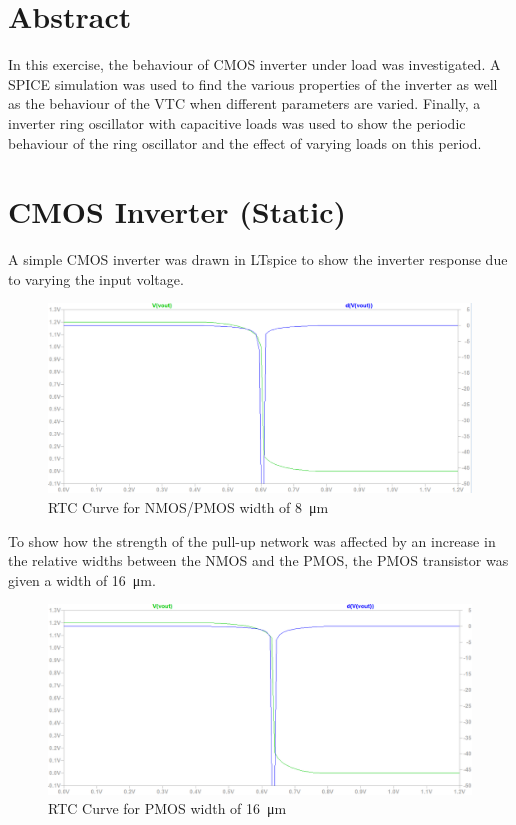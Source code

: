 \documentclass[CMPE]{../KGCOEReport}
\begin{document}
    \maketitle
    \section*{Abstract}

    In this exercise, the behaviour of CMOS inverter under load was investigated.
    A SPICE simulation was used to find the various properties of the inverter as
    well as the behaviour of the VTC when different parameters are varied. Finally,
    a inverter ring oscillator with capacitive loads was used to show the periodic
    behaviour of the ring oscillator and the effect of varying loads on this period.\\

    \section*{CMOS Inverter (Static)}

     A simple CMOS inverter was drawn in LTspice to show the inverter response due to
     varying the input voltage.
     
     \begin{figure}[h!]
     	\centering
       \includegraphics[width=5.5in]{img/p4_8u}
       \caption{RTC Curve for NMOS/PMOS width of \SI{8}{\micro\metre}}
       \label{fig:vtc_8u}
	 \end{figure}
	 
	 To show how the strength of the pull-up network was affected by an increase in the
	 relative widths between the NMOS and the PMOS, the PMOS transistor was given a width
	 of \SI{16}{\micro\metre}.
     
     \begin{figure}[h!]
     	\centering
       \includegraphics[width=5.5in]{img/p4_16u}
       \caption{RTC Curve for PMOS width of \SI{16}{\micro\metre}}
       \label{fig:vtc_16u}
	 \end{figure}
	 
\end{document}
